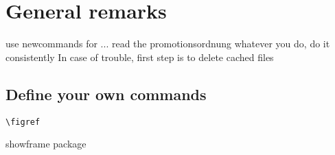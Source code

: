 \chapter{General remarks}\label{cha:remarks}

use newcommands for ...
read the promotionsordnung
whatever you do, do it consistently
In case of trouble, first step is to delete cached files

\section{Define your own commands}
\verb|\figref|


showframe package